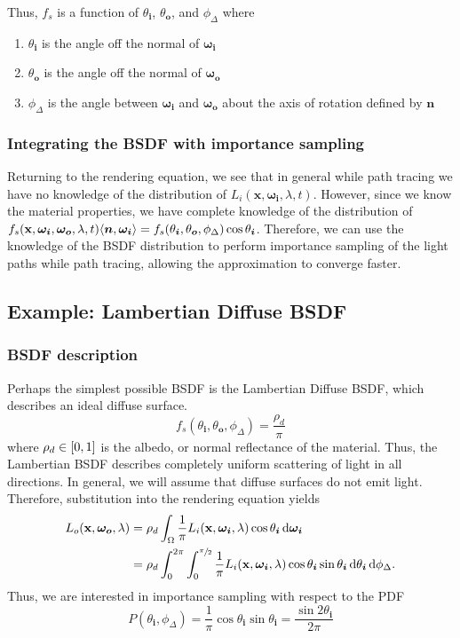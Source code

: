 \documentclass[12pt]{article}
\DeclarePairedDelimiter\ip{\langle }{\rangle}
\begin{document}
Thus, \(f_s\) is a function of \(\theta_{\bm i}\), \(\theta_{\bm o}\), and \(\phi_\Delta\) where
\begin{enumerate}
\item \(\theta_{\bm i}\) is the angle off the normal of \(\bm{\omega_i}\)
\item \(\theta_{\bm o}\) is the angle off the normal of \(\bm{\omega_o}\)
\item \(\phi_\Delta\) is the angle between \(\bm{\omega_i}\) and \(\bm{\omega_o}\) about the axis of rotation defined by \(\bm n\)
\end{enumerate}

\subsubsection{Integrating the BSDF with importance sampling}
Returning to the rendering equation, we see that in general while path tracing we have no knowledge of the distribution of \(L_i(\mathbf x, \bm{\omega_i}, \lambda, t)\).
However, since we know the material properties, we have complete knowledge of the distribution of \(f_s(\mathbf x, \bm{\omega_i}, \bm{\omega_o}, \lambda, t)\ip{\bm n, \bm{\omega_i}} = f_s(\theta_{\bm i}, \theta_{\bm o}, \phi_\Delta)\cos \theta_{\bm i}\).
Therefore, we can use the knowledge of the BSDF distribution to perform importance sampling of the light paths while path tracing, allowing the approximation to converge faster.

\subsection{Example: Lambertian Diffuse BSDF}
\subsubsection{BSDF description}
Perhaps the simplest possible BSDF is the Lambertian Diffuse BSDF, which describes an ideal diffuse surface.
\[f_s(\theta_{\bm i}, \theta_{\bm o}, \phi_\Delta) = \frac{\rho_d}{\pi}\]
where \(\rho_d \in \intcc{0,1}\) is the albedo, or normal reflectance of the material.
Thus, the Lambertian BSDF describes completely uniform scattering of light in all directions.
In general, we will assume that diffuse surfaces do not emit light.
Therefore, substitution into the rendering equation yields
\begin{align*}
  L_{o}(\mathbf x, \bm {\omega_{o}}, \lambda)
  &= \rho_d \int_\Omega \frac{1}{\pi} L_i(\mathbf x, \bm{\omega_i}, \lambda)\cos\theta_{\bm i} \dif \bm{\omega_i}\\
  &= \rho_d \int_0^{2\pi}\int_0^{\sfrac{\pi}{2}} \frac{1}{\pi} L_i(\mathbf x, \bm{\omega_i}, \lambda)\cos\theta_{\bm i} \sin\theta_{\bm i}\dif \theta_{\bm i} \dif \phi_\Delta.
\end{align*}
Thus, we are interested in importance sampling with respect to the PDF
\[P(\theta_{\bm i}, \phi_\Delta) = \frac{1}{\pi}\cos \theta_{\bm i}\sin \theta_{\bm i} = \frac{\sin 2\theta_{\bm i}}{2\pi}\]
\end{document}
